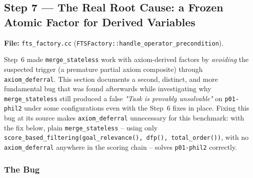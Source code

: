 \documentclass[11pt,a4paper]{article}
\begin{document}
\subsection{Step 7 --- The Real Root Cause: a Frozen Atomic Factor for
Derived Variables}
\label{sec:step7}

\textbf{File:} \texttt{fts\_factory.cc}
(\texttt{FTSFactory::handle\_operator\_precondition}).

Step~6 made \texttt{merge\_stateless} work with axiom-derived factors by
\emph{avoiding} the suspected trigger (a premature partial axiom composite)
through \texttt{axiom\_deferral}. This section documents a second, distinct,
and more fundamental bug that was found afterwards while investigating
why \texttt{merge\_stateless} still produced a false
\emph{"Task is provably unsolvable"} on \texttt{p01-phil2} under some
configurations even with the Step~6 fixes in place. Fixing this bug at its
source makes \texttt{axiom\_deferral} unnecessary for this benchmark: with the
fix below, plain \texttt{merge\_stateless} -- using only
\texttt{score\_based\_filtering(goal\_relevance(), dfp(), total\_order())},
with no \texttt{axiom\_deferral} anywhere in the scoring chain -- solves
\texttt{p01-phil2} correctly.

\subsubsection{The Bug}
\end{document}
